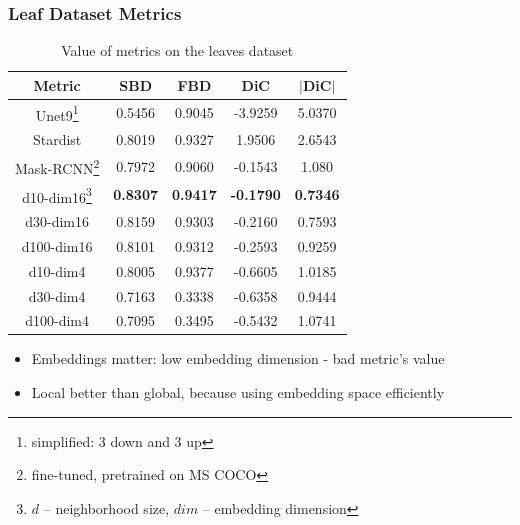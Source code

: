 \documentclass{beamer}
\begin{document}
\begin{frame}
    \frametitle{Leaf Dataset Metrics}

    \begin{table}
        \small
        \begin{tabular}[pos]{*{5}{c}}
            \hline
            Metric                                                                     & SBD             & FBD             & DiC              & $|$DiC$|$       \\
            \hline
            Unet9\footnote{simplified: 3 down and 3 up}                                & 0.5456          & 0.9045          & -3.9259          & 5.0370          \\
            Stardist                                                                   & 0.8019          & 0.9327          & 1.9506           & 2.6543          \\
            Mask-RCNN\footnote{fine-tuned, pretrained on MS COCO}                      & 0.7972          & 0.9060          & -0.1543          & 1.080           \\
            \hline
            d10-dim16\footnote{$d$ -- neighborhood size, $dim$ -- embedding dimension} & \textbf{0.8307} & \textbf{0.9417} & \textbf{-0.1790} & \textbf{0.7346} \\
            d30-dim16                                                                  & 0.8159          & 0.9303          & -0.2160          & 0.7593          \\
            d100-dim16                                                                 & 0.8101          & 0.9312          & -0.2593          & 0.9259          \\
            \hline
            d10-dim4                                                                   & 0.8005          & 0.9377          & -0.6605          & 1.0185          \\
            d30-dim4                                                                   & 0.7163          & 0.3338          & -0.6358          & 0.9444          \\
            d100-dim4                                                                  & 0.7095          & 0.3495          & -0.5432          & 1.0741          \\
            \hline
        \end{tabular}
        \caption{Value of metrics on the leaves dataset}
    \end{table}

    \vspace*{-0.5cm}
    \begin{itemize}
        \item Embeddings matter: low embedding dimension
              - bad metric's value
        \item Local better than global, because using embedding space
              efficiently
    \end{itemize}

\end{frame}
\end{document}
